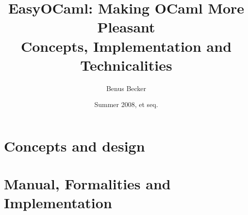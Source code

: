 \documentclass[11pt,titlepage,abstracton]{scrartcl} %
\title{EasyOCaml: Making OCaml More Pleasant \large \\[0.5em]
Concepts, Implementation and Technicalities}
\author{Benus Becker}
\date{Summer 2008, et seq.}
\begin{document}



\clearpage \part{Concepts and design} \label{part:concepts}




\clearpage \part{Manual, Formalities and Implementation} \label{part:implem}

\clearpage
\clearpage


\clearpage
\end{document}
